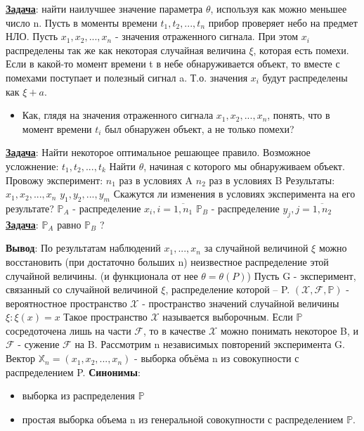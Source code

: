 \documentclass{article}
\begin{document}
\underline {\textbf{Задача}}: найти наилучшее значение параметра $\theta$, используя как можно меньшее число n.
\Ex  Пусть в моменты времени $t_1, t_2, ..., t_n$ прибор проверяет небо на предмет НЛО. Пусть $x_1, x_2, ..., x_n$ - значения отраженного сигнала. При этом $x_i$ распределены так же как некоторая случайная величина $\xi$, которая есть помехи. Если в какой-то момент времени t в небе обнаруживается объект, то вместе с помехами поступает и полезный сигнал a. 
Т.о. значения $x_i$ будут распределены как $\xi + a$.
\begin{itemize}
 \item Как, глядя на значения отраженного сигнала $x_1, x_2, ..., x_n$, понять, что в момент времени $t_i$ был обнаружен объект, а не только помехи?
 \end{itemize}
\underline {\textbf{Задача}}: Найти некоторое оптимальное решающее правило.
Возможное усложнение: 
$t_1, t_2, ..., t_k$
Найти $\theta$, начиная с которого мы обнаруживаем объект.
\Ex Провожу эксперимент: \newline
$n_1$ раз в условиях A \newline
$n_2$ раз в условиях B \newline
Результаты: \newline
$x_1, x_2, ..., x_n$ \newline
$y_1, y_2, ..., y_m$ \newline
Скажутся ли изменения в условиях эксперимента на его результате? \newline
$\mathbb{P}_A$ - распределение $x_i, i = \overline{1,n_1}$ \newline
$\mathbb{P}_B$ - распределение $y_j, j = \overline{1,n_2}$ \newline
\underline {\textbf{Задача}}:
$\mathbb{P}_A$ равно $\mathbb{P}_B$ ?  \newline

\noindent \textbf{Вывод}:  По результатам наблюдений $x_1, ..., x_n$ за случайной величиной $\xi$ можно восстановить (при достаточно больших n) неизвестное распределение этой случайной величины. (и функционала от нее $\theta = \theta(P)$) \newline
Пусть G -  эксперимент, связанный со случайной величиной  $\xi$, распределение которой -- P.
$(\mathcal{X}, \mathcal{F}, \mathbb{P})$ - вероятностное пространство
$\mathcal{X}$ - пространство значений случайной величины $\xi: \xi(x) = x$
\Def Такое пространство $\mathcal{X}$ называется выборочным. \newline
Если $\mathbb{P}$ сосредоточена лишь на части $\mathcal{F}$, то в качестве $\mathcal{X}$ можно понимать некоторое B, и $\mathcal{F}$ - сужение $\mathcal{F}$ на B. \newline
Рассмотрим n независимых повторений эксперимента G.
\Def  Вектор $\mathbb{X}_n = (x _1, x_2, ..., x_n)$ - выборка объёма n из совокупности с распределением P. \newline
\textbf{Синонимы}:
\begin{itemize}
\item выборка из распределения $\mathbb{P}$
\item простая выборка объема n из генеральной совокупности с распределением $\mathbb{P}$.
\end{itemize}
\end{document}
